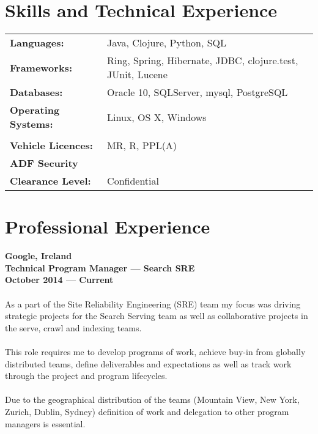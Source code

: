 \documentclass[a4paper]{article}
\begin{document}
\section*{Skills and Technical Experience}
\begin{tabular}{l l}
\textbf{Languages:} & Java, Clojure, Python, SQL\\
\textbf{Frameworks:} & Ring, Spring, Hibernate, JDBC, clojure.test, JUnit, Lucene\\
\textbf{Databases:} & Oracle 10, SQLServer, mysql, PostgreSQL\\
\textbf{Operating Systems:} & Linux, OS X, Windows\\\\
\textbf{Vehicle Licences:}&MR, R, PPL(A)\\
\textbf{ADF Security}&\\\textbf{Clearance Level:}&Confidential\\
\end{tabular}
\vspace{5pt}
\section*{Professional Experience}
\textbf{Google, Ireland\\Technical Program Manager --- Search SRE\\October 2014 --- Current}\\\\
As a part of the Site Reliability Engineering (SRE) team my focus was driving strategic projects for the Search Serving team as well as collaborative projects in the serve, crawl and indexing teams.
\\\\
This role requires me to develop programs of work, achieve buy-in from globally distributed teams, define deliverables and expectations as well as track work through the project and program lifecycles.
\\\\
Due to the geographical distribution of the teams (Mountain View, New York, Zurich, Dublin, Sydney) definition of work and delegation to other program managers is essential.
\end{document}
